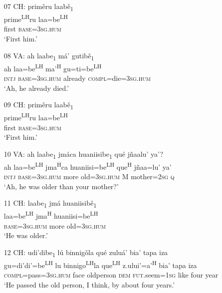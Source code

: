 \begin{itemize}
\item[07 CH:]
\glll prim\v{e}ru laab\v{e}\textsubscript{1}  \\                                    
prime\textsuperscript{LH}ru laa=be\textsuperscript{LH} \\
first \textsc{base}=\textsc{3sg.hum} \\
\glt `First him.'


\item[08 VA:] 	
\glll ah laabe\textsubscript{1} m\'{a}' gutib\v{e}\textsubscript{1} \\
ah laa=be\textsuperscript{LH}  ma'\textsuperscript{H} gu=ti=be\textsuperscript{LH}   \\
\textsc{intj} \textsc{base}=\textsc{3sg.hum} already \textsc{compl}=die=\textsc{3sg.hum}  \\
\glt `Ah, he already died.'


\item[09 CH:]
\glll prim\v{e}ru laab\v{e}\textsubscript{1}  \\                                    
prime\textsuperscript{LH}ru laa=be\textsuperscript{LH}   \\
first \textsc{base}=\textsc{3sg.hum}  \\
\glt `First him.'


\item[10 VA:]
\glll ah laabe\textsubscript{1} jm\'{a}ca huaniisibe\textsubscript{1} qu\'{e} j\~{n}aalu' ya'?  \\
ah laa=be\textsuperscript{LH}  jma\textsuperscript{H}ca huaniisi=be\textsuperscript{LH}  que\textsuperscript{H} j\~{n}aa=lu' ya'  \\
\textsc{intj} \textsc{base}=\textsc{3sg.hum} more old=\textsc{3sg.hum} M mother=\textsc{2sg} \textsc{q}  \\
\glt `Ah, he was older than your mother?'


\item[11 CH:]
\glll laabe\textsubscript{1} jm\'{a} huaniisib\v{e}\textsubscript{1} \\
laa=be\textsuperscript{LH}  jma\textsuperscript{H} huaniisi=be\textsuperscript{LH}   \\
\textsc{base}=\textsc{3sg.hum} more old=\textsc{3sg.hum}  \\    	 
\glt `He was older.'


\item[12 CH:]
\glll udi'dibe\textsubscript{1} l\'{u} binnig\v{o}la qu\'{e} zulu\'{a}' bia' tapa iza  \\
gu=di'di'=be\textsuperscript{LH}  lu binnigo\textsuperscript{LH}la que\textsuperscript{LH} z.ului'=a'\textsuperscript{H} bia' tapa iza  \\
\textsc{compl}=pass=\textsc{3sg.hum} face oldperson \textsc{dem} \textsc{fut}.seem=\textsc{1sg} like four year  \\
\glt `He passed the old person, I think, by about four years.'



\end{itemize}
